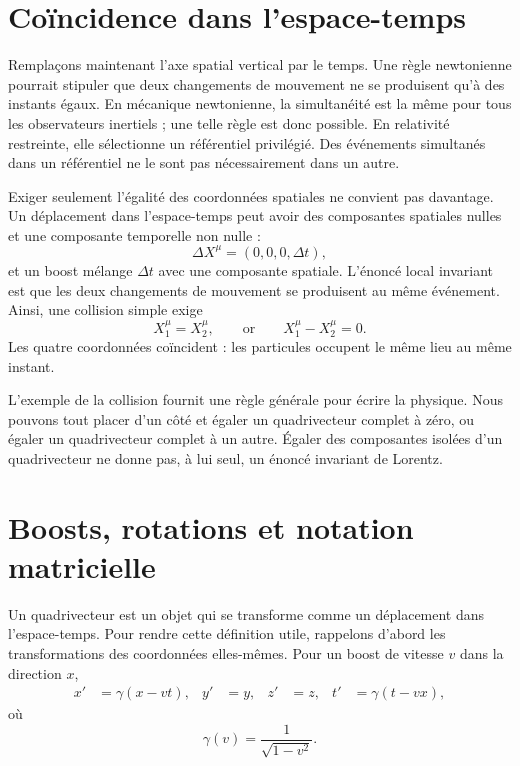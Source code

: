 \section{Coïncidence dans l’espace-temps}

Remplaçons maintenant l’axe spatial vertical par le temps. Une règle newtonienne pourrait stipuler que deux changements de mouvement ne se produisent qu’à des instants égaux. En mécanique newtonienne, la simultanéité est la même pour tous les observateurs inertiels ; une telle règle est donc possible. En relativité restreinte, elle sélectionne un référentiel privilégié. Des événements simultanés dans un référentiel ne le sont pas nécessairement dans un autre.

Exiger seulement l’égalité des coordonnées spatiales ne convient pas davantage. Un déplacement dans l’espace-temps peut avoir des composantes spatiales nulles et une composante temporelle non nulle : \begin{equation}
  \Delta X^\mu=(0,0,0,\Delta t),
\end{equation} et un boost mélange \(\Delta t\) avec une composante spatiale. L’énoncé local invariant est que les deux changements de mouvement se produisent au même événement. Ainsi, une collision simple exige \begin{equation}
  X_1^\mu=X_2^\mu,
  \qquad\text{or}\qquad
  X_1^\mu-X_2^\mu=0.
\end{equation} Les quatre coordonnées coïncident : les particules occupent le même lieu au même instant.

L’exemple de la collision fournit une règle générale pour écrire la physique. Nous pouvons tout placer d’un côté et égaler un quadrivecteur complet à zéro, ou égaler un quadrivecteur complet à un autre. Égaler des composantes isolées d’un quadrivecteur ne donne pas, à lui seul, un énoncé invariant de Lorentz.

\section{Boosts, rotations et notation matricielle}

Un quadrivecteur est un objet qui se transforme comme un déplacement dans l’espace-temps. Pour rendre cette définition utile, rappelons d’abord les transformations des coordonnées elles-mêmes. Pour un boost de vitesse \(v\) dans la direction \(x\), \begin{align}
  x'&=\gamma(x-vt), & y'&=y, & z'&=z,
  & t'&=\gamma(t-vx),                                      \label{eq:l6-boost}
\end{align} où \begin{equation}
  \gamma(v)=\frac{1}{\sqrt{1-v^2}}.
\end{equation}

